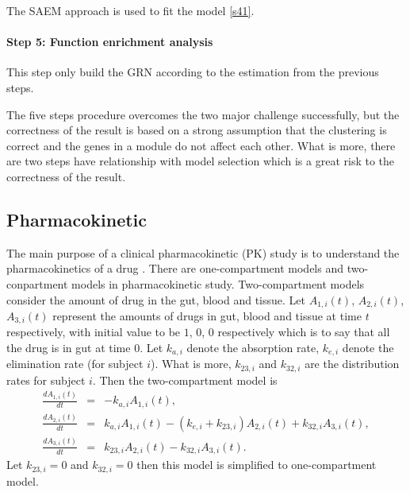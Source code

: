 \documentclass[12pt]{extarticle}
\begin{document}
The SAEM approach \cite{Delyon99} is used to fit the model \eqref{s41}.
\paragraph{Step 5: Function enrichment analysis}
This step only build the GRN according to the estimation from the previous steps.

The five steps procedure overcomes the two major challenge successfully, but the correctness of the result is based on a strong assumption that the clustering is correct and the genes in a module do not affect each other. What is more, there are two steps have relationship with model selection which is a great risk to the correctness of the result.

\subsection{Pharmacokinetic}
\label{sect:pharmacokinetic}
The main purpose of a clinical pharmacokinetic (PK) study is to understand the pharmacokinetics of a drug \cite{Li02}. There are one-compartment models and two-conpartment models in pharmacokinetic study. Two-compartment models consider the amount of drug in the gut, blood and tissue. Let $A_{1,i}(t)$, $A_{2,i}(t)$, $A_{3,i}(t)$ represent the amounts of drugs in gut, blood and tissue at time $t$ respectively, with initial value to be $1$, $0$, $0$ respectively which is to say that all the drug is in gut at time $0$. Let $k_{a,i}$ denote the absorption rate, $k_{e,i}$ denote the elimination rate (for subject $i$). What is more, $k_{23,i}$ and $k_{32,i}$ are the distribution rates for subject $i$. Then the two-compartment model is
\begin{equation}
\begin{array}{rcl}
\frac{dA_{1,i}(t)}{dt} & = & -k_{a,i}A_{1,i}(t), \\
\frac{dA_{2,i}(t)}{dt} & = & k_{a,i}A_{1,i}(t) - (k_{e,i}+k_{23,i})A_{2,i}(t)+k_{32,i}A_{3,i}(t), \\
\frac{dA_{3,i}(t)}{dt} & = & k_{23,i}A_{2,i}(t)-k_{32,i}A_{3,i}(t).
\end{array}
\end{equation}
Let $k_{23,i}=0$ and $k_{32,i}=0$ then this model is simplified to one-compartment model. 
\end{document}
